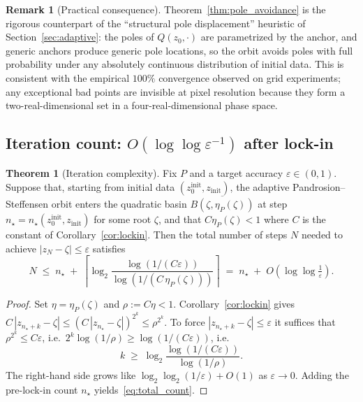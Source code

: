 \documentclass[11pt,a4paper]{article}
\theoremstyle{definition}
\newtheorem{theorem}{Theorem}[section]
\newtheorem{remark}{Remark}[section]
\begin{document}
\begin{remark}[Practical consequence]
Theorem~\ref{thm:pole_avoidance} is the rigorous counterpart of the ``structural pole displacement'' heuristic of Section~\ref{sec:adaptive}: the poles of $Q(z_0, \cdot)$ are parametrized by the anchor, and generic anchors produce generic pole locations, so the orbit avoids poles with full probability under any absolutely continuous distribution of initial data.  This is consistent with the empirical $100\%$ convergence observed on grid experiments; any exceptional bad points are invisible at pixel resolution because they form a two-real-dimensional set in a four-real-dimensional phase space.
\end{remark}

\subsection{Iteration count: \texorpdfstring{$O(\log\log \varepsilon^{-1})$}{O(log log 1/eps)} after lock-in}

\begin{theorem}[Iteration complexity]
\label{thm:iteration_count}
Fix $P$ and a target accuracy $\varepsilon \in (0, 1)$.  Suppose that, starting from initial data $(z_0^{\mathrm{init}}, z_{\mathrm{init}})$, the adaptive Pandrosion--Steffensen orbit enters the quadratic basin $\overline{B(\zeta, \eta_P(\zeta))}$ at step $n_\star = n_\star(z_0^{\mathrm{init}}, z_{\mathrm{init}})$ for some root $\zeta$, and that $C \eta_P(\zeta) < 1$ where $C$ is the constant of Corollary~\ref{cor:lockin}.  Then the total number of steps $N$ needed to achieve $|z_N - \zeta| \leq \varepsilon$ satisfies
\begin{equation}
  \label{eq:total_count}
  N \;\leq\; n_\star \;+\; \left\lceil \log_2 \frac{\log(1/(C\varepsilon))}{\log(1/(C\,\eta_P(\zeta)))} \right\rceil
  \;=\; n_\star \;+\; O\!\left(\log\log \tfrac{1}{\varepsilon}\right).
\end{equation}
\end{theorem}

\begin{proof}
Set $\eta = \eta_P(\zeta)$ and $\rho := C\eta < 1$.  Corollary~\ref{cor:lockin} gives $C\,|z_{n_\star + k} - \zeta| \leq (C\,|z_{n_\star} - \zeta|)^{2^k} \leq \rho^{2^k}$.  To force $|z_{n_\star + k} - \zeta| \leq \varepsilon$ it suffices that $\rho^{2^k} \leq C\varepsilon$, i.e.\ $2^k \log(1/\rho) \geq \log(1/(C\varepsilon))$, i.e.
\[
  k \;\geq\; \log_2\!\frac{\log(1/(C\varepsilon))}{\log(1/\rho)}.
\]
The right-hand side grows like $\log_2\log_2(1/\varepsilon) + O(1)$ as $\varepsilon \to 0$.  Adding the pre-lock-in count $n_\star$ yields~\eqref{eq:total_count}.
\end{proof}
\end{document}

